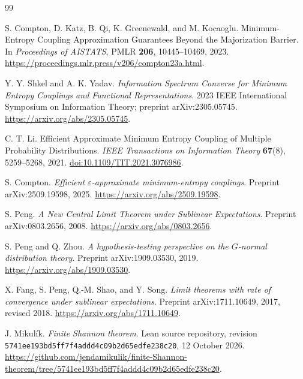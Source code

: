 \documentclass[11pt,a4paper]{article}
\theoremstyle{definition}\newtheorem{definition}[theorem]{Definition}
\theoremstyle{remark}\newtheorem{remark}[theorem]{Remark}
\numberwithin{equation}{section}
\begin{document}
\begin{thebibliography}{99}
\raggedright
{}
S. Compton, D. Katz, B. Qi, K. Greenewald, and M. Kocaoglu.
Minimum-Entropy Coupling Approximation Guarantees Beyond the Majorization
Barrier. In \emph{Proceedings of AISTATS}, PMLR \textbf{206},
10445--10469, 2023.
\url{https://proceedings.mlr.press/v206/compton23a.html}.

Y. Y. Shkel and A. K. Yadav.
\emph{Information Spectrum Converse for Minimum Entropy Couplings and
Functional Representations}. 2023 IEEE International Symposium on
Information Theory; preprint arXiv:2305.05745.
\url{https://arxiv.org/abs/2305.05745}.

C. T. Li. Efficient Approximate Minimum Entropy Coupling of Multiple
Probability Distributions. \emph{IEEE Transactions on Information Theory}
\textbf{67}(8), 5259--5268, 2021.
\href{https://doi.org/10.1109/TIT.2021.3076986}{doi:10.1109/TIT.2021.3076986}.

S. Compton. \emph{Efficient $\varepsilon$-approximate minimum-entropy
couplings}. Preprint arXiv:2509.19598, 2025.
\url{https://arxiv.org/abs/2509.19598}.

S. Peng. \emph{A New Central Limit Theorem under Sublinear Expectations}.
Preprint arXiv:0803.2656, 2008.
\url{https://arxiv.org/abs/0803.2656}.

S. Peng and Q. Zhou. \emph{A hypothesis-testing perspective on the
$G$-normal distribution theory}. Preprint arXiv:1909.03530, 2019.
\url{https://arxiv.org/abs/1909.03530}.

X. Fang, S. Peng, Q.-M. Shao, and Y. Song.
\emph{Limit theorems with rate of convergence under sublinear expectations}.
Preprint arXiv:1711.10649, 2017, revised 2018.
\url{https://arxiv.org/abs/1711.10649}.

J. Mikul\'ik. \emph{Finite Shannon theorem}. Lean source repository,
revision \texttt{5741ee193bd5ff7f4addd4c09b2d65edfe238c20}, 12 October 2026.
\url{https://github.com/jendamikulik/finite-Shannon-theorem/tree/5741ee193bd5ff7f4addd4c09b2d65edfe238c20}.
\end{thebibliography}
\end{document}
